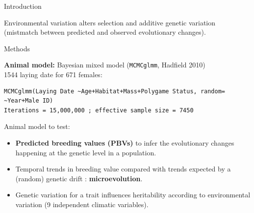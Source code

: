 \documentclass[compress]{beamer}
\begin{document}
\begin{frame}{Introduction}

Environmental variation alters selection and additive genetic variation (mistmatch between predicted and observed evolutionary changes).

\end{frame}
\begin{frame}[fragile]{Methods}

\textbf{Animal model:} Bayesian mixed model \scriptsize{(\texttt{MCMCglmm}, Hadfield 2010)}  \\
\normalsize
1544 laying date for 671 females:
\begin{lstlisting}[basicstyle=\footnotesize]
MCMCglmm(Laying Date ~Age+Habitat+Mass+Polygame Status, random= ~Year+Male ID)
Iterations = 15,000,000 ; effective sample size = 7450
\end{lstlisting}

Animal model to test:
\begin{itemize}
 \item \textbf{Predicted breeding values (PBVs)} to infer the evolutionary changes happening at the genetic level in a population.

\item Temporal trends in breeding value compared with trends expected by a (random) genetic drift : \textbf{microevolution}.

\item Genetic variation for a trait influences heritability according to environmental variation (9 independent climatic variables).

\end{itemize}
\end{frame}
\end{document}
